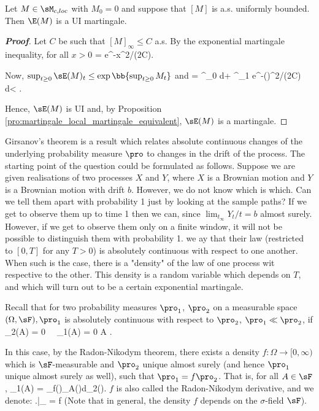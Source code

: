 \begin{proposition}\label{pro:exponential_ui_martingale}
Let $M \in \sM_{c,loc}$ with $M_0 = 0$ and suppose that $[M]$ is a.s. uniformly bounded. Then $\E(M)$ is a UI martingale. 
\end{proposition}

\begin{proof}[\bf Proof]
Let $C$ be such that $[M]_\infty \leq C$ a.s. By the exponential martingale inequality, for all $x > 0$
\be
\pro{} = \pro{} \leq e^{-x^2/(2C)}.
\ee

Now, $\sup_{t\geq0} \sE(M)_t \leq \exp\bb{\sup_{t\geq0} M_t}$ and
\be
\E{} = \int^\infty_0 \pro{}d\lm {}+ \int^\infty_1 e^{-(\log \lm)^2/(2C)} d\lm < \infty.
\ee

Hence, $\sE(M)$ is UI and, by Proposition \ref{pro:martingale_local_martingale_equivalent}, $\sE(M)$ is a martingale.
\end{proof}

Girsanov's theorem is a result which relates absolute continuous changes of the underlying probability measure $\pro$ to changes in the drift of the process. The starting point of the question could be formulated as follows. Suppose we are given realisations of two processes $X$ and $Y$, where $X$ is a Brownian motion and $Y$ is a Brownian motion with drift $b$. However, we do not know which is which. Can we tell them apart with probability 1 just by looking at the sample paths? If we get to observe them up to time 1 then we can, since $\lim_{t_\infty} Y_t/t = b$ almost surely. However, if we get to observe them only on a finite window, it will not be possible to distinguish them with probability 1. we ay that their law (restricted to $[0, T]$ for
any $T > 0$) is absolutely continuous with respect to one another. When such is the case, there is a "density" of the law of one process wit respective to the other. This density is a random variable which depends on $T$, and which will turn out to be a certain exponential martingale. 

Recall that for two probability measures $\pro_1$, $\pro_2$ on a measurable space $(\Omega,\sF), \pro_1$ is absolutely continuous with respect to $\pro_2$, $\pro_1 \ll \pro_2$, if
\be
\pro_2(A) = 0 \ \ra\ \pro_1(A) = 0 \quad{}A \in \sF.
\ee

In this case, by the Radon-Nikodym theorem, there exists a density $f: \Omega \to [0,\infty)$ which is $\sF$-measurable and $\pro_2$ unique almost surely (and hence $\pro_1$ unique almost surely as well), such that $\pro_1 = f \pro_2$. That is, for all $A \in \sF$, 
\be
\pro_1(A) = \int_\Omega f(\omega)\ind_A(\omega)d\pro_2(\omega).
\ee
$f$ is also called the Radon-Nikodym derivative, and we denote:
\be
\left.\right|_{\sF} = f
\ee
(Note that in general, the density $f$ depends on the $\sigma$-field $\sF$).

